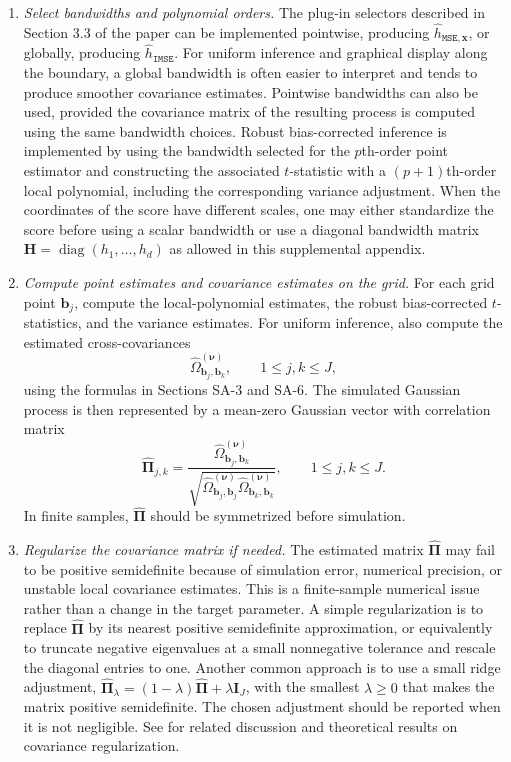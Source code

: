 \documentclass[10pt]{article}
\DeclareMathOperator*{\diag}{diag}
\newcommand{\bb}{\mathbf{b}}
\newcommand{\bH}{\mathbf{H}}
\newcommand{\bx}{\mathbf{x}}
\newcommand{\bnu}{\boldsymbol{\nu}}
\newcommand{\bPi}{\boldsymbol{\Pi}}
\begin{document}
\begin{enumerate}[leftmargin=*]
    \item \textit{Select bandwidths and polynomial orders.}
    The plug-in selectors described in Section 3.3 of the paper can be implemented pointwise, producing $\widehat{h}_{\mathtt{MSE},\bx}$, or globally, producing $\widehat{h}_{\mathtt{IMSE}}$. For uniform inference and graphical display along the boundary, a global bandwidth is often easier to interpret and tends to produce smoother covariance estimates. Pointwise bandwidths can also be used, provided the covariance matrix of the resulting process is computed using the same bandwidth choices. Robust bias-corrected inference is implemented by using the bandwidth selected for the $p$th-order point estimator and constructing the associated $t$-statistic with a $(p+1)$th-order local polynomial, including the corresponding variance adjustment. When the coordinates of the score have different scales, one may either standardize the score before using a scalar bandwidth or use a diagonal bandwidth matrix $\bH=\diag(h_1,\ldots,h_d)$ as allowed in this supplemental appendix.

    \item \textit{Compute point estimates and covariance estimates on the grid.}
    For each grid point $\bb_j$, compute the local-polynomial estimates, the robust bias-corrected $t$-statistics, and the variance estimates. For uniform inference, also compute the estimated cross-covariances
    \[
        \widehat{\Omega}_{\bb_j,\bb_k}^{(\bnu)},
        \qquad 1\leq j,k\leq J,
    \]
    using the formulas in Sections SA-3 and SA-6. The simulated Gaussian process is then represented by a mean-zero Gaussian vector with correlation matrix
    \[
        \widehat{\bPi}_{j,k}
        =
        \frac{\widehat{\Omega}_{\bb_j,\bb_k}^{(\bnu)}}
        {\sqrt{\widehat{\Omega}_{\bb_j,\bb_j}^{(\bnu)}
               \widehat{\Omega}_{\bb_k,\bb_k}^{(\bnu)}}},
        \qquad 1\leq j,k\leq J.
    \]
    In finite samples, $\widehat{\bPi}$ should be symmetrized before simulation.

    \item \textit{Regularize the covariance matrix if needed.}
    The estimated matrix $\widehat{\bPi}$ may fail to be positive semidefinite because of simulation error, numerical precision, or unstable local covariance estimates. This is a finite-sample numerical issue rather than a change in the target parameter. A simple regularization is to replace $\widehat{\bPi}$ by its nearest positive semidefinite approximation, or equivalently to truncate negative eigenvalues at a small nonnegative tolerance and rescale the diagonal entries to one. Another common approach is to use a small ridge adjustment, $\widehat{\bPi}_{\lambda}=(1-\lambda)\widehat{\bPi}+\lambda \mathbf{I}_J$, with the smallest $\lambda\geq0$ that makes the matrix positive semidefinite. The chosen adjustment should be reported when it is not negligible. See \citet{Cattaneo-Feng-Underwood_2024_JASA} for related discussion and theoretical results on covariance regularization.


\end{enumerate}
\end{document}
